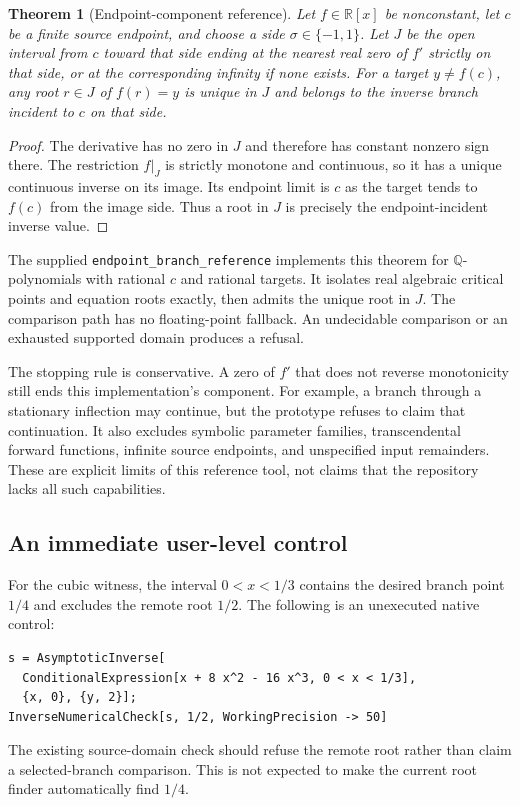 \documentclass[11pt,letterpaper]{article}
\newcommand{\code}[1]{{\small\nolinkurl{#1}}}
\newcommand{\RR}{\mathbb R}
\newcommand{\QQ}{\mathbb Q}
\newtheorem{theorem}[proposition]{Theorem}
\begin{document}
\begin{theorem}[Endpoint-component reference]
Let $f\in\RR[x]$ be nonconstant, let $c$ be a finite source endpoint, and choose a side $\sigma\in\{-1,1\}$. Let $J$ be the open interval from $c$ toward that side ending at the nearest real zero of $f'$ strictly on that side, or at the corresponding infinity if none exists. For a target $y\ne f(c)$, any root $r\in J$ of $f(r)=y$ is unique in $J$ and belongs to the inverse branch incident to $c$ on that side.
\end{theorem}
\begin{proof}
The derivative has no zero in $J$ and therefore has constant nonzero sign there. The restriction $f|_J$ is strictly monotone and continuous, so it has a unique continuous inverse on its image. Its endpoint limit is $c$ as the target tends to $f(c)$ from the image side. Thus a root in $J$ is precisely the endpoint-incident inverse value.
\end{proof}

The supplied \code{endpoint_branch_reference} implements this theorem for $\QQ$-polynomials with rational $c$ and rational targets. It isolates real algebraic critical points and equation roots exactly, then admits the unique root in $J$. The comparison path has no floating-point fallback. An undecidable comparison or an exhausted supported domain produces a refusal.

The stopping rule is conservative. A zero of $f'$ that does not reverse monotonicity still ends this implementation's component. For example, a branch through a stationary inflection may continue, but the prototype refuses to claim that continuation. It also excludes symbolic parameter families, transcendental forward functions, infinite source endpoints, and unspecified input remainders. These are explicit limits of this reference tool, not claims that the repository lacks all such capabilities.

\subsection{An immediate user-level control}

For the cubic witness, the interval $0<x<1/3$ contains the desired branch point $1/4$ and excludes the remote root $1/2$. The following is an unexecuted native control:
\begin{lstlisting}
s = AsymptoticInverse[
  ConditionalExpression[x + 8 x^2 - 16 x^3, 0 < x < 1/3],
  {x, 0}, {y, 2}];
InverseNumericalCheck[s, 1/2, WorkingPrecision -> 50]
\end{lstlisting}
The existing source-domain check should refuse the remote root rather than claim a selected-branch comparison. This is not expected to make the current root finder automatically find $1/4$.
\end{document}
